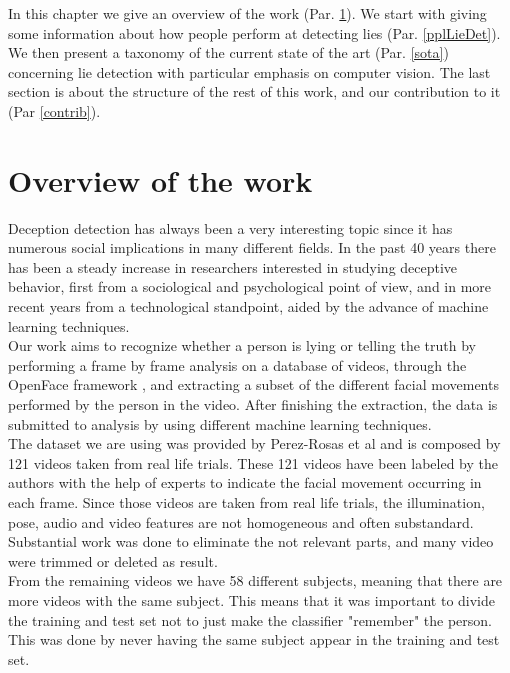 In this chapter we give an overview of the work (Par. \ref{overview}). We start with giving some information about how people perform at detecting lies (Par. \ref{pplLieDet}). We then present a taxonomy of the current state of the art (Par. \ref{sota}) concerning lie detection with particular emphasis on computer vision. The last section is about the structure of the rest of this work, and our contribution to it (Par \ref{contrib}).

\pagebreak

\section{Overview of the work} \label{overview}
Deception detection has always been a very interesting topic since it has numerous social implications in many different fields. In the past 40 years there has been a steady increase in researchers interested in studying deceptive behavior, first from a sociological and psychological point of view, and in more recent years from a technological standpoint, aided by the advance of machine learning techniques.\\
Our work aims to recognize whether a person is lying or telling the truth by performing a frame by frame analysis on a database of videos, through the OpenFace framework \cite{Baltru2018}, and extracting a subset of the different facial movements performed by the person in the video. After finishing the extraction, the data is submitted to analysis by using different machine learning techniques.\\
The dataset we are using was provided by Perez-Rosas et al \cite{Perez-Rosas:2015:DDU:2818346.2820758} and is composed by 121 videos taken from real life trials. These 121 videos have been labeled by the authors with the help of experts to indicate the facial movement occurring in each frame. Since those videos are taken from real life trials, the illumination, pose, audio and video features are not homogeneous and often substandard. Substantial work was done to eliminate the not relevant parts, and many video were trimmed or deleted as result.\\
From the remaining videos we have 58 different subjects, meaning that there are more videos with the same subject. This means that it was important to divide the training and test set not to just make the classifier "remember" the person. This was done by never having the same subject appear in the training and test set. \\
